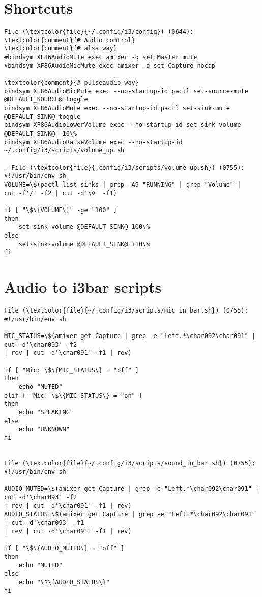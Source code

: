 \documentclass[10pt, a4paper, onecolumn, openany]{book}         %
\begin{document}
\section{Shortcuts}
\begin{Verbatim}[commandchars=\\\{\}]
File (\textcolor{file}{~/.config/i3/config}) (0644):
\textcolor{comment}{# Audio control}
\textcolor{comment}{# alsa way}
#bindsym XF86AudioMute exec amixer -q set Master mute
#bindsym XF86AudioMicMute exec amixer -q set Capture nocap

\textcolor{comment}{# pulseaudio way}
bindsym XF86AudioMicMute exec --no-startup-id pactl set-source-mute @DEFAULT_SOURCE@ toggle
bindsym XF86AudioMute exec --no-startup-id pactl set-sink-mute @DEFAULT_SINK@ toggle
bindsym XF86AudioLowerVolume exec --no-startup-id set-sink-volume @DEFAULT_SINK@ -10\%
bindsym XF86AudioRaiseVolume exec --no-startup-id ~/.config/i3/scripts/volume_up.sh

- File (\textcolor{file}{.config/i3/scripts/volume_up.sh}) (0755):
#!/usr/bin/env sh
VOLUME=\$(pactl list sinks | grep -A9 "RUNNING" | grep "Volume" |
cut -f'/' -f2 | cut -d'\%' -f1)

if [ "\$\{VOLUME\}" -ge "100" ]
then
    set-sink-volume @DEFAULT_SINK@ 100\%
else
    set-sink-volume @DEFAULT_SINK@ +10\%
fi
\end{Verbatim}

\section{Audio to i3bar scripts}
\begin{Verbatim}[commandchars=\\\{\}]
File (\textcolor{file}{~/.config/i3/scripts/mic_in_bar.sh}) (0755):
#!/usr/bin/env sh

MIC_STATUS=\$(amixer get Capture | grep -e "Left.*\char092\char091" | cut -d'\char093' -f2 
| rev | cut -d'\char091' -f1 | rev)

if [ "Mic: \$\{MIC_STATUS\} = "off" ]
then
    echo "MUTED"
elif [ "Mic: \$\{MIC_STATUS\} = "on" ]
then
    echo "SPEAKING"
else
    echo "UNKNOWN"
fi


File (\textcolor{file}{~/.config/i3/scripts/sound_in_bar.sh}) (0755):
#!/usr/bin/env sh

AUDIO_MUTED=\$(amixer get Capture | grep -e "Left.*\char092\char091" | cut -d'\char093' -f2 
| rev | cut -d'\char091' -f1 | rev)
AUDIO_STATUS=\$(amixer get Capture | grep -e "Left.*\char092\char091" | cut -d'\char093' -f1 
| rev | cut -d'\char091' -f1 | rev)

if [ "\$\{AUDIO_MUTED\} = "off" ]
then
    echo "MUTED"
else
    echo "\$\{AUDIO_STATUS\}"
fi
\end{Verbatim}
\end{document}

